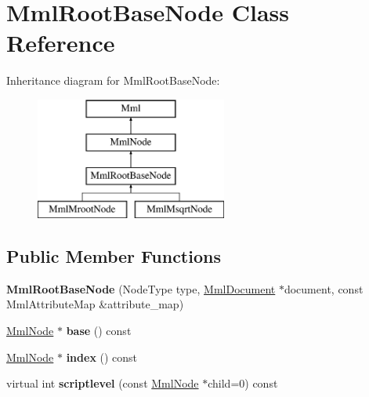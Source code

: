 \hypertarget{class_mml_root_base_node}{}\section{Mml\+Root\+Base\+Node Class Reference}
\label{class_mml_root_base_node}
Inheritance diagram for Mml\+Root\+Base\+Node\+:\begin{figure}[H]
\begin{center}
\leavevmode
\includegraphics[height=4.000000cm]{class_mml_root_base_node}
\end{center}
\end{figure}
\subsection*{Public Member Functions}
\begin{DoxyCompactItemize}
\item 
\mbox{\label{class_mml_root_base_node_adbac41b929196cf042ab27c9b500726d}} 
{\bfseries Mml\+Root\+Base\+Node} (Node\+Type type, \mbox{\hyperlink{class_mml_document}{Mml\+Document}} $\ast$document, const Mml\+Attribute\+Map \&attribute\+\_\+map)
\item 
\mbox{\label{class_mml_root_base_node_a3ab1270836a793459151df94441264cf}} 
\mbox{\hyperlink{class_mml_node}{Mml\+Node}} $\ast$ {\bfseries base} () const
\item 
\mbox{\label{class_mml_root_base_node_afe1b55f4bbadc1264dce69e4ec443efb}} 
\mbox{\hyperlink{class_mml_node}{Mml\+Node}} $\ast$ {\bfseries index} () const
\item 
\mbox{\label{class_mml_root_base_node_ab0a62fed7992f1f4bd8c1a2fd73a84f2}} 
virtual int {\bfseries scriptlevel} (const \mbox{\hyperlink{class_mml_node}{Mml\+Node}} $\ast$child=0) const
\end{DoxyCompactItemize}
